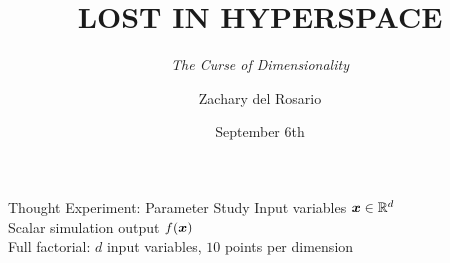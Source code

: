 \documentclass[14pt]{beamer}
\title{LOST IN HYPERSPACE}
\subtitle{\emph{The Curse of Dimensionality}}
\author{Zachary del Rosario}
\institute{zdr@stanford.edu}
\date{September 6th}
\begin{document}
\begin{frame}[plain]
\maketitle
\end{frame}

\begin{frame}[t]{Thought Experiment: Parameter Study}
  Input variables $\boldsymbol{x}\in\mathbb{R}^{d}$ \\
  Scalar simulation output $f(\boldsymbol{x})$ \\
  Full factorial: $d$ input variables, $10$ points per dimension \\

  \bigskip
\end{frame}
\end{document}
